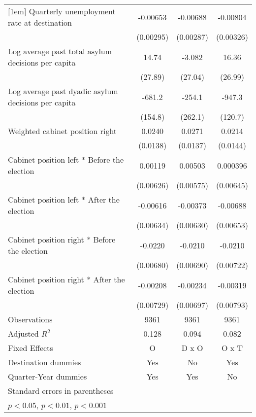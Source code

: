 \begin{table}[htbp]
\begin{tabular}{l*{3}{c}}
[1em]
Quarterly unemployment rate at destination&    -0.00653\sym{*}  &    -0.00688\sym{*}  &    -0.00804\sym{*}  \\
                    &   (0.00295)         &   (0.00287)         &   (0.00326)         \\
[1em]
Log average past total asylum decisions per capita&       14.74         &      -3.082         &       16.36         \\
                    &     (27.89)         &     (27.04)         &     (26.99)         \\
[1em]
Log average past dyadic asylum decisions per capita&      -681.2\sym{***}&      -254.1         &      -947.3\sym{***}\\
                    &     (154.8)         &     (262.1)         &     (120.7)         \\
[1em]
Weighted cabinet position right&      0.0240         &      0.0271         &      0.0214         \\
                    &    (0.0138)         &    (0.0137)         &    (0.0144)         \\
[1em]
Cabinet position left * Before the election&     0.00119         &     0.00503         &    0.000396         \\
                    &   (0.00626)         &   (0.00575)         &   (0.00645)         \\
[1em]
Cabinet position left * After the election&    -0.00616         &    -0.00373         &    -0.00688         \\
                    &   (0.00634)         &   (0.00630)         &   (0.00653)         \\
[1em]
Cabinet position right * Before the election&     -0.0220\sym{**} &     -0.0210\sym{**} &     -0.0210\sym{**} \\
                    &   (0.00680)         &   (0.00690)         &   (0.00722)         \\
[1em]
Cabinet position right * After the election&    -0.00208         &    -0.00234         &    -0.00319         \\
                    &   (0.00729)         &   (0.00697)         &   (0.00793)         \\
\hline
Observations        &        9361         &        9361         &        9361         \\
Adjusted \(R^{2}\)  &       0.128         &       0.094         &       0.082         \\
Fixed Effects       &           O         &       D x O         &       O x T         \\
Destination dummies &         Yes         &          No         &         Yes         \\
Quarter-Year dummies&         Yes         &         Yes         &          No         \\
\hline\hline
\multicolumn{4}{l}{\footnotesize Standard errors in parentheses}\\
\multicolumn{4}{l}{\footnotesize \sym{*} \(p<0.05\), \sym{**} \(p<0.01\), \sym{***} \(p<0.001\)}\\
\end{tabular}
\end{table}
